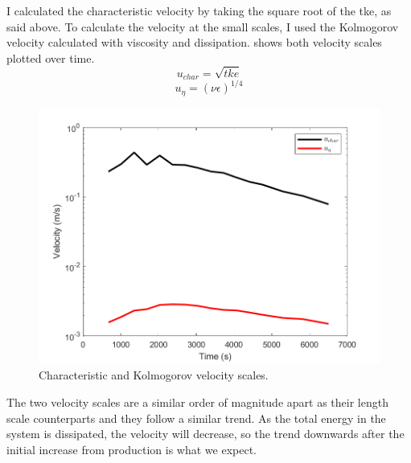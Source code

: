 \documentclass[11pt]{article}
\begin{document}
\begin{enumerate}
    I calculated the characteristic velocity by taking the square root of the tke, as said above. To calculate the velocity at the small scales, I used the Kolmogorov velocity calculated with viscosity and dissipation.  shows both velocity scales plotted over time.
    \begin{equation}
    	u_{char} = \sqrt{tke}
    \end{equation}
	\begin{equation}
		u_{\eta} = \left( \nu\epsilon \right)^{1/4}
	\end{equation}
    \begin{figure}[htbp]
    	\centering
    	\includegraphics[width=\textwidth]{1-plots/char_vel_plot.png}
    	\caption{Characteristic and Kolmogorov velocity scales.}
    	\label{fig:vel plot}
    \end{figure}
	The two velocity scales are a similar order of magnitude apart as their length scale counterparts and they follow a similar trend. As the total energy in the system is dissipated, the velocity will decrease, so the trend downwards after the initial increase from production is what we expect.
	

\end{enumerate}
\end{document}
